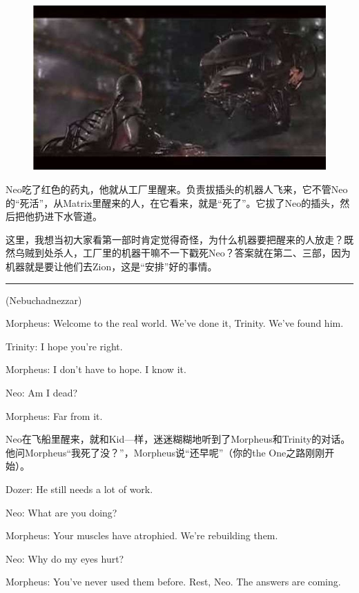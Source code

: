 \documentclass{ctexart}
\newcommand{\myparsep}{\noindent \rule[0.5ex]{\linewidth}{1pt}}
\newenvironment{myquote}{\color{green} \setlength{\leftskip}{6em} \setlength{\rightskip}{4em} \setlength{\parindent}{-2em}}{\par}
\begin{document}
\begin{figure}[htb]
\centering
\includegraphics[width=0.5\linewidth]{fig/read_Matrix-22-1}
\end{figure}

Neo吃了红色的药丸，他就从工厂里醒来。负责拔插头的机器人飞来，它不管Neo的“死活”，从Matrix里醒来的人，在它看来，就是“死了”。它拔了Neo的插头，然后把他扔进下水管道。

这里，我想当初大家看第一部时肯定觉得奇怪，为什么机器要把醒来的人放走？既然乌贼到处杀人，工厂里的机器干嘛不一下戳死Neo？答案就在第二、三部，因为机器就是要让他们去Zion，这是“安排”好的事情。

\myparsep

\begin{myquote}
(Nebuchadnezzar)

Morpheus: Welcome to the real world. We've done it, Trinity. We've found him.

Trinity: I hope you're right.

Morpheus: I don't have to hope. I know it.

Neo: Am I dead?

Morpheus: Far from it.
\end{myquote}

Neo在飞船里醒来，就和Kid—样，迷迷糊糊地听到了Morpheus和Trinity的对话。他问Morpheus“我死了没？”，Morpheus说“还早呢”（你的the One之路刚刚开始）。

\begin{myquote}
Dozer: He still needs a lot of work.

Neo: What are you doing?

Morpheus: Your muscles have atrophied. We're rebuilding them.

Neo: Why do my eyes hurt?

Morpheus: You've never used them before. Rest, Neo. The answers are coming.
\end{myquote}
\end{document}
